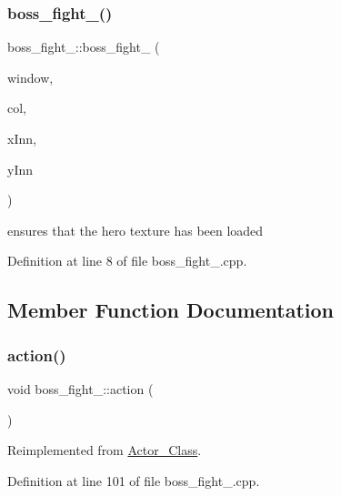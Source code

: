 \subsubsection{\texorpdfstring{boss\+\_\+fight\+\_()}{boss\_fight\_1()}}
{\footnotesize\ttfamily boss\+\_\+fight\+\_\+::boss\+\_\+fight\+\_ (\begin{DoxyParamCaption}\item[{sf\+::\+Render\+Window \&}]{window,  }\item[{\hyperlink{class_collision}{Collision}}]{col,  }\item[{int}]{x\+Inn,  }\item[{int}]{y\+Inn }\end{DoxyParamCaption})}

ensures that the hero texture has been loaded 

Definition at line 8 of file boss\+\_\+fight\+\_.\+cpp.



\subsection{Member Function Documentation}
\hypertarget{classboss__fight__1_a73c37c9ddf1b6370d1a9e2b5c9cd9b05}{}\label{classboss__fight__1_a73c37c9ddf1b6370d1a9e2b5c9cd9b05} 
\subsubsection{\texorpdfstring{action()}{action()}}
{\footnotesize\ttfamily void boss\+\_\+fight\+\_\+::action (\begin{DoxyParamCaption}{ }\end{DoxyParamCaption})\hspace{0.3cm}{\ttfamily [virtual]}}



Reimplemented from \hyperlink{class_actor___class_ab8e23ffae108da3b8eda67c6753bdae0}{Actor\+\_\+\+Class}.



Definition at line 101 of file boss\+\_\+fight\+\_.\+cpp.

\hypertarget{classboss__fight__1_a158e53600a084e13047732d89a0f4299}{}\label{classboss__fight__1_a158e53600a084e13047732d89a0f4299} 
